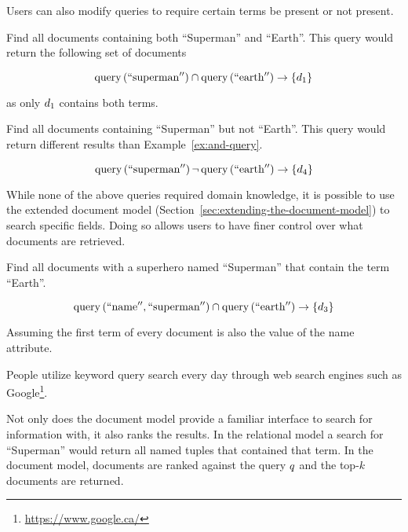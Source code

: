 		Users can also modify queries to require certain terms be present or not present.
		
		\begin{ex}
		\label{ex:and-query}
			Find all documents containing both ``Superman'' and ``Earth''.  This query would return the following set of documents
			
			$$\operatorname{query}\left(\mathrm{``superman''}\right) \cap \operatorname{query}\left(\mathrm{``earth''}\right) \rightarrow \left\{d_1\right\}$$
			
			as only $d_1$ contains both terms.
		\end{ex}
		
		\begin{ex}
			Find all documents containing ``Superman'' but not ``Earth''.  This query would return different results than Example~\ref{ex:and-query}.
			
			$$\operatorname{query}\left(\mathrm{``superman''}\right) \neg\operatorname{query}\left(\mathrm{``earth''}\right) \rightarrow \left\{d_4\right\}$$
		\end{ex}
		
		While none of the above queries required domain knowledge, it is possible to use the extended document model (Section~\ref{sec:extending-the-document-model}) to search specific fields.  Doing so allows users to have finer control over what documents are retrieved.
		
		\begin{ex}
			Find all documents with a superhero named ``Superman'' that contain the term ``Earth''.
			
			$$\operatorname{query}\left(\mathrm{``name''}, \mathrm{``superman''}\right) \cap \operatorname{query}\left(\mathrm{``earth''}\right) \rightarrow \left\{d_3\right\}$$
			
			Assuming the first term of every document is also the value of the name attribute.
		\end{ex}
		
		People utilize keyword query search every day through web search engines such as Google\footnote{\url{https://www.google.ca/}}.
		
		Not only does the document model provide a familiar interface to search for information with, it also ranks the results.  In the relational model a search for ``Superman'' would return all named tuples that contained that term.  In the document model, documents are ranked against the query $q$ and the top-$k$ documents are returned.
		
